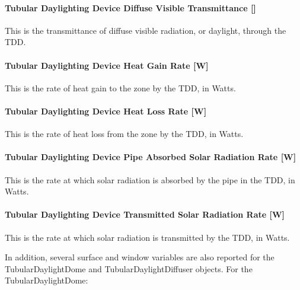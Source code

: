 \paragraph{\texorpdfstring{Tubular Daylighting Device Diffuse Visible Transmittance {[]}}{Tubular Daylighting Device Diffuse Visible Transmittance }}\label{tubular-daylighting-device-diffuse-visible-transmittance}

This is the transmittance of diffuse visible radiation, or daylight, through the TDD.

\paragraph{Tubular Daylighting Device Heat Gain Rate {[}W{]}}\label{tubular-daylighting-device-heat-gain-rate-w}

This is the rate of heat gain to the zone by the TDD, in Watts.

\paragraph{Tubular Daylighting Device Heat Loss Rate {[}W{]}}\label{tubular-daylighting-device-heat-loss-rate-w}

This is the rate of heat loss from the zone by the TDD, in Watts.

\paragraph{Tubular Daylighting Device Pipe Absorbed Solar Radiation Rate {[}W{]}}\label{tubular-daylighting-device-pipe-absorbed-solar-radiation-rate-w}

This is the rate at which solar radiation is absorbed by the pipe in the TDD, in Watts.

\paragraph{Tubular Daylighting Device Transmitted Solar Radiation Rate {[}W{]}}\label{tubular-daylighting-device-transmitted-solar-radiation-rate-w}

This is the rate at which solar radiation is transmitted by the TDD, in Watts.

In addition, several surface and window variables are also reported for the TubularDaylightDome and TubularDaylightDiffuser objects. For the TubularDaylightDome:


